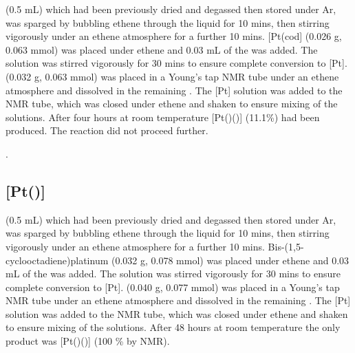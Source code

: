  (0.5 mL) which had been previously dried and degassed then stored under Ar, was sparged by bubbling ethene through the liquid for 10 mins, then stirring vigorously under an ethene atmosphere for a further 10 mins.  [Pt(cod] (0.026 g, 0.063 mmol) was placed under ethene and 0.03 mL of the  was added.  The solution was stirred vigorously for 30 mins to ensure complete conversion to [Pt].  \tBusixantphos(0.032 g, 0.063 mmol) was placed in a Young's tap NMR tube under an ethene atmosphere and dissolved in the remaining .  The [Pt] solution was added to the NMR tube, which was closed under ethene and shaken to ensure mixing of the solutions.  After four hours at room temperature [Pt(\tBusixantphos)()] (11.1\%) had been produced.  The reaction did not proceed further.

.

\subsection*{\texorpdfstring{[Pt(\tButhixantphos)]} P}



 (0.5 mL) which had been previously dried and degassed then stored under Ar, was sparged by bubbling ethene through the liquid for 10 mins, then stirring vigorously under an ethene atmosphere for a further 10 mins.  Bis-(1,5-cyclooctadiene)platinum (0.032 g, 0.078 mmol) was placed under ethene and 0.03 mL of the  was added.  The solution was stirred vigorously for 30 mins to ensure complete conversion to [Pt].  \tButhixantphos(0.040 g, 0.077 mmol) was placed in a Young's tap NMR tube under an ethene atmosphere and dissolved in the remaining .  The [Pt] solution was added to the NMR tube, which was closed under ethene and shaken to ensure mixing of the solutions.  After 48 hours at room temperature the only product was [Pt(\tButhixantphos)()] (100 \% by NMR).  

